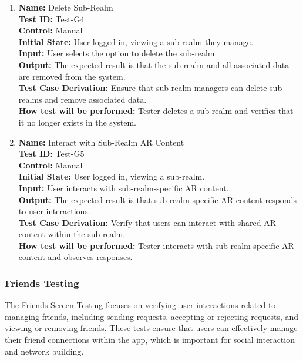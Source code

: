 \documentclass[12pt, titlepage]{article}
\begin{document}
\begin{enumerate}
  \item \textbf{Name:} {Delete Sub-Realm} \label{itm:Test-G4}\\
        \textbf{Test ID:} Test-G4\\
        \textbf{Control:} Manual \\
        \textbf{Initial State:} User logged in, viewing a sub-realm they manage. \\
        \textbf{Input:} User selects the option to delete the sub-realm. \\
        \textbf{Output:} The expected result is that the sub-realm and all associated data are removed from the system. \\
        \textbf{Test Case Derivation:} Ensure that sub-realm managers can delete sub-realms and remove associated data. \\
        \textbf{How test will be performed:} Tester deletes a sub-realm and verifies that it no longer exists in the system.

  \item \textbf{Name:} {Interact with Sub-Realm AR Content} \label{itm:Test-G5}\\
        \textbf{Test ID:} Test-G5\\
        \textbf{Control:} Manual \\
        \textbf{Initial State:} User logged in, viewing a sub-realm. \\
        \textbf{Input:} User interacts with sub-realm-specific AR content. \\
        \textbf{Output:} The expected result is that sub-realm-specific AR content responds to user interactions. \\
        \textbf{Test Case Derivation:} Verify that users can interact with shared AR content within the sub-realm. \\
        \textbf{How test will be performed:} Tester interacts with sub-realm-specific AR content and observes responses.

\end{enumerate}

\subsubsection{Friends Testing}
\label{sec:friends_screen_testing}

The Friends Screen Testing focuses on verifying user interactions related to managing friends, including sending requests, accepting or rejecting requests, and viewing or removing friends. These tests ensure that users can effectively manage their friend connections within the app, which is important for social interaction and network building.
\end{document}

